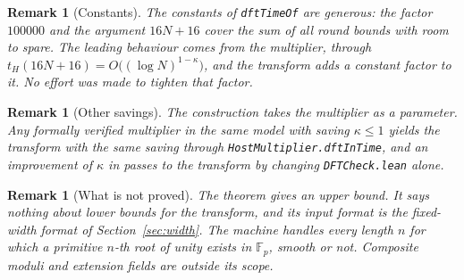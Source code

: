 \documentclass[11pt]{amsart}
\newtheorem{remark}[lemma]{Remark}
\newcommand{\F}{\mathbb{F}}
\newcommand{\lean}[1]{\texttt{#1}}
\begin{document}
\begin{remark}[Constants]
The constants of \lean{dftTimeOf} are generous: the factor $100000$ and the argument $16N + 16$
cover the sum of all round bounds with room to spare. The leading behaviour comes from the
multiplier, through $t_H(16N + 16) = O\bigl((\log N)^{1-\kappa}\bigr)$, and the transform adds
a constant factor to it. No effort was made to tighten that factor.
\end{remark}

\begin{remark}[Other savings]
The construction takes the multiplier as a parameter. Any formally verified multiplier in the
same model with saving $\kappa \le 1$ yields the transform with the same saving through
\lean{HostMultiplier.dftInTime}, and an improvement of $\kappa$ in \cite{IMB} passes to the
transform by changing \lean{DFTCheck.lean} alone.
\end{remark}

\begin{remark}[What is not proved]
The theorem gives an upper bound. It says nothing about lower bounds for the transform, and its
input format is the fixed-width format of Section~\ref{sec:width}. The machine handles every
length $n$ for which a primitive $n$-th root of unity exists in $\F_p$, smooth or not.
Composite moduli and extension fields are outside its scope.
\end{remark}
\end{document}
